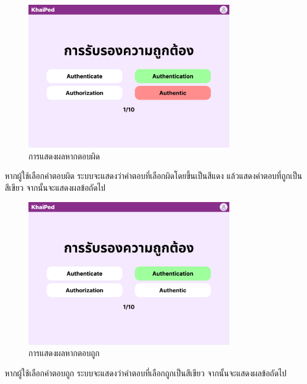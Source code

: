 \documentclass[12pt,oneside,openright,a4paper]{cpe-thai-project}
\begin{document}
\begin{figure}[!h]\centering
	\includegraphics[width=0.8\textwidth, keepaspectratio=true]{image/chap3/ui/quiz/Quiz - Wrong Answer.png}
	\caption{การแสดงผลหากตอบผิด}\label{fig:UI_QuizWrong}
\end{figure}
\hspace{1cm}
หากผู้ใช้เลือกคำตอบผิด ระบบจะแสดงว่าคำตอบที่เลือกผิดโดยขึ้นเป็นสีแดง แล้วแสดงคำตอบที่ถูกเป็นสีเขียว จากนั้นจะแสดงผลข้อถัดไป

\pagebreak
\begin{figure}[!h]\centering
	\includegraphics[width=0.8\textwidth, keepaspectratio=true]{image/chap3/ui/quiz/Quiz - Correct Answer.png}
	\caption{การแสดงผลหากตอบถูก}\label{fig:UI_QuizCorrect}
\end{figure}
\hspace{1cm}
หากผู้ใช้เลือกคำตอบถูก ระบบจะแสดงว่าคำตอบที่เลือกถูกเป็นสีเขียว จากนั้นจะแสดงผลข้อถัดไป
\end{document}
